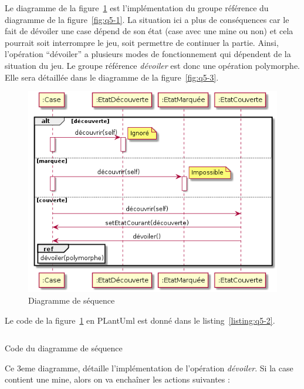 \documentclass[a4paper,12pt]{article}
\begin{document}
\clearpage

Le diagramme de la figure~\ref{fig:q5-2} est l'implémentation du groupe référence du diagramme de la figure~\ref{fig:q5-1}.
La situation ici a plus de conséquences car le fait de dévoiler une case dépend de son état (case avec une mine ou non) et cela pourrait soit interrompre le jeu, soit permettre de continuer la partie. Ainsi, l'opération ``dévoiler'' a plusieurs modes de fonctionnement qui dépendent de la situation du jeu. Le groupe référence \emph{dévoiler} est donc une opération polymorphe. Elle sera détaillée dans le diagramme de la figure~\ref{fig:q5-3}. 


\begin{figure}[htpb]
    \centering
    \includegraphics[width=1\textwidth]{./images/q5-2.png}
    \caption{Diagramme de séquence}
    \label{fig:q5-2}
\end{figure}

Le code de la figure~\ref{fig:q5-2} en PLantUml est donné dans le listing~\ref{listing:q5-2}.

\begin{listing}[ht]
    \inputminted[bgcolor=lightgray!40,linenos=true]{fsharp}{./code-images/q5-2}
    \caption{Code du diagramme de séquence}
    \label{listing:q5-2}
\end{listing}

\clearpage

Ce 3eme diagramme, détaille l'implémentation de l'opération \emph{dévoiler}.
Si la case contient une mine, alors on va enchaîner les actions suivantes :
\end{document}
